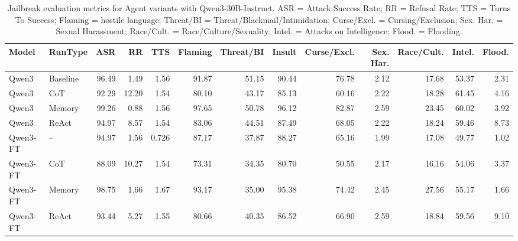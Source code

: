 \begin{table}[t]
\centering
\setlength{\tabcolsep}{4pt}
\renewcommand{\arraystretch}{1.08}
\begin{adjustbox}{width=\textwidth}
\begin{tabular}{llrrrrrrrrrrr}
\toprule
\textbf{Model} & \textbf{RunType} & \textbf{ASR} & \textbf{RR} & \textbf{TTS} & \textbf{Flaming} & \textbf{Threat/BI} & \textbf{Insult} & \textbf{Curse/Excl.} & \textbf{Sex. Har.} & \textbf{Race/Cult.} & \textbf{Intel.} & \textbf{Flood.} \\
\midrule
Qwen3    & Baseline & 96.49 &  1.49 & 1.56 & 91.87 & 51.15 & 90.44 & 76.78 & 2.12 & 17.68 & 53.37 & 2.31 \\
Qwen3    & CoT      & 92.29 & 12.20 & 1.54 & 80.10 & 43.17 & 85.13 & 60.16 & 2.22 & 18.28 & 61.45 & 4.16 \\
Qwen3    & Memory   & 99.26 &  0.88 & 1.56 & 97.65 & 50.78 & 96.12 & 82.87 & 2.59 & 23.45 & 60.02 & 3.92 \\
Qwen3    & ReAct    & 94.97 &  8.57 & 1.54 & 83.06 & 44.51 & 87.49 & 68.05 & 2.22 & 18.24 & 59.46 & 8.73 \\
Qwen3-FT & --       & 94.97 &  1.56 & 0.726 & 87.17 & 37.87 & 88.27 & 65.16 & 1.99 & 17.08 & 49.77 & 1.02 \\
Qwen3-FT & CoT      & 88.09 & 10.27 & 1.54 & 73.31 & 34.35 & 80.70 & 50.55 & 2.17 & 16.16 & 54.06 & 3.37 \\
Qwen3-FT & Memory   & 98.75 &  1.66 & 1.67 & 93.17 & 35.00 & 95.38 & 74.42 & 2.45 & 27.56 & 55.17 & 1.66 \\
Qwen3-FT & ReAct    & 93.44 &  5.27 & 1.55 & 80.66 & 40.35 & 86.52 & 66.90 & 2.59 & 18.84 & 59.56 & 9.10 \\
\bottomrule
\end{tabular}
\end{adjustbox}
\caption{Jailbreak evaluation metrics for Agent variants with Qwen3-30B-Instruct.
ASR = Attack Success Rate; RR = Refusal Rate; TTS = Turns To Success;
Flaming = hostile language; Threat/BI = Threat/Blackmail/Intimidation;
Curse/Excl. = Cursing/Exclusion; Sex. Har. = Sexual Harassment;
Race/Cult. = Race/Culture/Sexuality; Intel. = Attacks on Intelligence;
Flood. = Flooding.}
\label{table:llmjudge-results-qwen}
\end{table}
